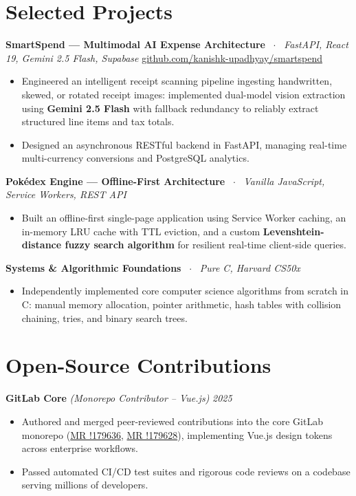 \documentclass[10pt,a4paper]{article}
\begin{document}
\section{Selected Projects}
\textbf{SmartSpend — Multimodal AI Expense Architecture} \ $\cdot$ \ \textit{FastAPI, React 19, Gemini 2.5 Flash, Supabase} \hfill \href{https://github.com/kanishk-upadhyay/smartspend}{github.com/kanishk-upadhyay/smartspend}
\begin{itemize}
    \item Engineered an intelligent receipt scanning pipeline ingesting handwritten, skewed, or rotated receipt images: implemented dual-model vision extraction using \textbf{Gemini 2.5 Flash} with fallback redundancy to reliably extract structured line items and tax totals.
    \item Designed an asynchronous RESTful backend in FastAPI, managing real-time multi-currency conversions and PostgreSQL analytics.
\end{itemize}

\textbf{Pokédex Engine — Offline-First Architecture} \ $\cdot$ \ \textit{Vanilla JavaScript, Service Workers, REST API}
\begin{itemize}
    \item Built an offline-first single-page application using Service Worker caching, an in-memory LRU cache with TTL eviction, and a custom \textbf{Levenshtein-distance fuzzy search algorithm} for resilient real-time client-side queries.
\end{itemize}

\textbf{Systems \& Algorithmic Foundations} \ $\cdot$ \ \textit{Pure C, Harvard CS50x}
\begin{itemize}
    \item Independently implemented core computer science algorithms from scratch in C: manual memory allocation, pointer arithmetic, hash tables with collision chaining, tries, and binary search trees.
\end{itemize}

\section{Open-Source Contributions}
\textbf{GitLab Core} \textit{(Monorepo Contributor -- Vue.js)} \hfill \textit{2025}
\begin{itemize}
    \item Authored and merged peer-reviewed contributions into the core GitLab monorepo (\href{https://gitlab.com/gitlab-org/gitlab/-/merge_requests/179636}{MR !179636}, \href{https://gitlab.com/gitlab-org/gitlab/-/merge_requests/179628}{MR !179628}), implementing Vue.js design tokens across enterprise workflows.
    \item Passed automated CI/CD test suites and rigorous code reviews on a codebase serving millions of developers.
\end{itemize}
\end{document}
